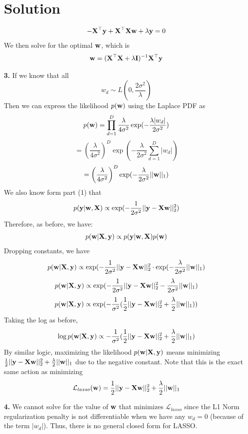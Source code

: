 \documentclass[submit]{../harvardml}
\newenvironment{solution}
  {\color{black}\section*{Solution}}
{}
\begin{document}
\begin{solution}
\begin{tcolorbox}
        $$-\mathbf{X}^\top\mathbf{y} + \mathbf{X}^\top\mathbf{X}\mathbf{w} + \lambda\mathbf{y} = 0$$
        We then solve for the optimal $\mathbf{w}$, which is
        $$\mathbf{w} = (\mathbf{X}^\top\mathbf{X} + \lambda\mathbf{I})^{-1}\mathbf{X}^\top\mathbf{y}$$
    \end{tcolorbox}
    \begin{tcolorbox}
        \textbf{3.} If we know that all
        $$w_d \sim L\left(0,\frac{2\sigma^2}{\lambda}\right)$$
        Then we can express the likelihood $p(\mathbf{w})$ using the Laplace PDF as
        $$p(\mathbf{w}) = \prod_{d = 1}^D \frac{\lambda}{4\sigma^2}\exp(-\frac{\lambda|w_d|}{2\sigma^2})$$
        $$ = \left(\frac{\lambda}{4\sigma^2}\right)^{D} \exp(-\frac{\lambda}{2\sigma^2} \sum_{d = 1}^D |w_d|)$$
        $$ = \left(\frac{\lambda}{4\sigma^2}\right)^{D} \exp(-\frac{\lambda}{2\sigma^2} ||\mathbf{w}||_1)$$
        We also know form part (1) that
        $$p(\bold y | \mathbf{w}, \mathbf{X}) \propto  \exp(- \frac{1}{2\sigma^2} ||\mathbf{y} - \mathbf{X}\mathbf{w}||^2_2)$$
        Therefore, as before, we have:
        $$p(\mathbf{w} | \mathbf{X}, \mathbf{y}) \propto p(\bold y | \mathbf{w}, \mathbf{X})p(\mathbf{w})$$
        Dropping constants, we have
        $$p(\mathbf{w} | \mathbf{X}, \mathbf{y}) \propto \exp(- \frac{1}{2\sigma^2} ||\mathbf{y} - \mathbf{X}\mathbf{w}||^2_2 \cdot \exp(-\frac{\lambda}{2\sigma^2} ||\mathbf{w}||_1)$$
        $$p(\mathbf{w} | \mathbf{X}, \mathbf{y}) \propto \exp(- \frac{1}{2\sigma^2} ||\mathbf{y} - \mathbf{X}\mathbf{w}||^2_2-\frac{\lambda}{2\sigma^2} ||\mathbf{w}||_1)$$
        $$p(\mathbf{w} | \mathbf{X}, \mathbf{y}) \propto \exp(-\frac{1}{\sigma^2} (\frac{1}{2}||\mathbf{y} - \mathbf{X}\mathbf{w}||^2_2 +\frac{\lambda}{2} ||\mathbf{w}||_1))$$
        Taking the log as before,
        $$\log p(\mathbf{w} | \mathbf{X}, \mathbf{y}) \propto-\frac{1}{\sigma^2} (\frac{1}{2}||\mathbf{y} - \mathbf{X}\mathbf{w}||^2_2 +\frac{\lambda}{2} ||\mathbf{w}||_1)$$
        By similar logic, maximizing the likelihood $p(\mathbf{w} | \mathbf{X}, \mathbf{y})$ means minimizing $\frac{1}{2}||\mathbf{y} - \mathbf{X}\mathbf{w}||^2_2 +\frac{\lambda}{2} ||\mathbf{w}||_1$ due to the negative constant. Note that this is the exact same action as minimizing
        $$\mathcal{L}_{lasso}(\mathbf{w}) = \frac{1}{2}||\mathbf{y} -\bold X\mathbf{w}||_2^2  + \frac{\lambda}{2}||\mathbf{w}||_1$$
    \end{tcolorbox}
    \begin{tcolorbox}
        \textbf{4.} We cannot solve for the value of $\mathbf{w}$ that minimizes $\mathcal{L}_{lasso}$ since the L1 Norm regularization penalty is not differentiable when we have any $w_d = 0$ (because of the term $|w_d|$). Thus, there is no general closed form for LASSO.
    \end{tcolorbox}
    \begin{figure}[H]

\end{figure}
\end{solution}
\end{document}
